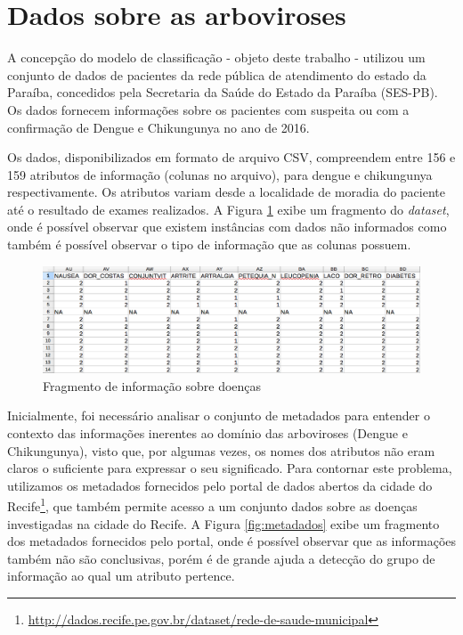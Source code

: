 \section{Dados sobre as arboviroses}

A concepção do modelo de classificação - objeto deste trabalho - utilizou um conjunto de dados de pacientes da rede pública de atendimento do estado da Paraíba, concedidos pela Secretaria da Saúde do Estado da Paraíba (SES-PB). Os dados fornecem informações sobre os pacientes com suspeita ou com a confirmação de Dengue e Chikungunya no ano de 2016.

Os dados, disponibilizados em formato de arquivo CSV, compreendem entre 156 e 159 atributos de informação (colunas no arquivo), para dengue e chikungunya respectivamente. Os atributos variam desde a localidade de moradia do paciente até o resultado de exames realizados. A Figura \ref{fig:csvses} exibe um fragmento do \textit{dataset}, onde é possível observar que existem instâncias com dados não informados como também é possível observar o tipo de informação que as colunas possuem.

\begin{figure}[htb]
  \caption{\label{fig:csvses}Fragmento de informação sobre doenças}
  \begin{center}
    \includegraphics[width=\textwidth]{imagens/fragmentodosdados.png}
  \end{center}
\end{figure}

Inicialmente, foi necessário analisar o conjunto de metadados para entender o contexto das informações inerentes ao domínio das arboviroses (Dengue e Chikungunya), visto que, por algumas vezes, os nomes dos atributos não eram claros o suficiente para expressar o seu significado. Para contornar este problema, utilizamos os metadados fornecidos pelo portal de dados abertos da cidade do Recife\footnote{\url{http://dados.recife.pe.gov.br/dataset/rede-de-saude-municipal}}, que também permite acesso a um conjunto dados sobre as doenças investigadas na cidade do Recife. A Figura \ref{fig:metadados} exibe um fragmento dos metadados fornecidos pelo portal, onde é possível observar que as informações também não são conclusivas, porém é de grande ajuda a detecção do grupo de informação ao qual um atributo pertence.

